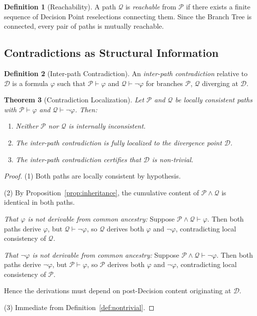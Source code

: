 \documentclass[12pt, a4paper]{article}
\theoremstyle{plain}
\newtheorem{theorem}{Theorem}[section]
\theoremstyle{definition}
\newtheorem{definition}[theorem]{Definition}
\theoremstyle{remark}
\newcommand{\CA}[2]{#1 \wedge #2}
\begin{document}
\begin{definition}[Reachability]
\label{def:reachability}
A path $\mathcal{Q}$ is \emph{reachable} from $\mathcal{P}$ if there
exists a finite sequence of Decision Point reselections connecting
them. Since the Branch Tree is connected, every pair of paths is
mutually reachable.
\end{definition}

\subsection{Contradictions as Structural Information}
\label{subsec:contradictions}

\begin{definition}[Inter-path Contradiction]
\label{def:inter-contradiction}
An \emph{inter-path contradiction} relative to $\mathcal{D}$ is a
formula $\varphi$ such that $\mathcal{P} \vdash \varphi$ and
$\mathcal{Q} \vdash \neg\varphi$ for branches $\mathcal{P}$, $\mathcal{Q}$
diverging at $\mathcal{D}$.
\end{definition}

\begin{theorem}[Contradiction Localization]
\label{thm:localization}
Let $\mathcal{P}$ and $\mathcal{Q}$ be locally consistent paths with
$\mathcal{P} \vdash \varphi$ and $\mathcal{Q} \vdash \neg\varphi$. Then:
\begin{enumerate}
  \item Neither $\mathcal{P}$ nor $\mathcal{Q}$ is internally
        inconsistent.
  \item The inter-path contradiction is fully localized to the
        divergence point $\mathcal{D}$.
  \item The inter-path contradiction certifies that $\mathcal{D}$
        is non-trivial.
\end{enumerate}
\end{theorem}

\begin{proof}
(1) Both paths are locally consistent by hypothesis.

(2) By Proposition~\ref{prop:inheritance}, the cumulative content of
$\CA{\mathcal{P}}{\mathcal{Q}}$ is identical in both paths.

\textit{That $\varphi$ is not derivable from common ancestry:}
Suppose $\CA{\mathcal{P}}{\mathcal{Q}} \vdash \varphi$. Then both
paths derive $\varphi$, but $\mathcal{Q} \vdash \neg\varphi$, so
$\mathcal{Q}$ derives both $\varphi$ and $\neg\varphi$, contradicting
local consistency of $\mathcal{Q}$.

\textit{That $\neg\varphi$ is not derivable from common ancestry:}
Suppose $\CA{\mathcal{P}}{\mathcal{Q}} \vdash \neg\varphi$. Then both
paths derive $\neg\varphi$, but $\mathcal{P} \vdash \varphi$, so
$\mathcal{P}$ derives both $\varphi$ and $\neg\varphi$, contradicting
local consistency of $\mathcal{P}$.

Hence the derivations must depend on post-Decision content originating
at $\mathcal{D}$.

(3) Immediate from Definition~\ref{def:nontrivial}.
\end{proof}
\end{document}
